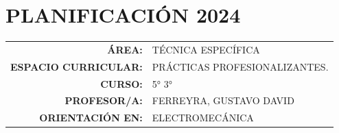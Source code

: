 \documentclass[a4paper]{article}
\begin{document}
\section*{\centering PLANIFICACIÓN 2024}

\begin{tabular}{r l}
     
\textbf{ÁREA:}&TÉCNICA ESPECÍFICA \\

\textbf{ESPACIO CURRICULAR:} &PRÁCTICAS PROFESIONALIZANTES. \\

\textbf{CURSO:}&5° 3°\\

\textbf{PROFESOR/A:}& FERREYRA, GUSTAVO DAVID\\

\textbf{ORIENTACIÓN EN:} & ELECTROMECÁNICA  \\
     
\end{tabular}
\end{document}
